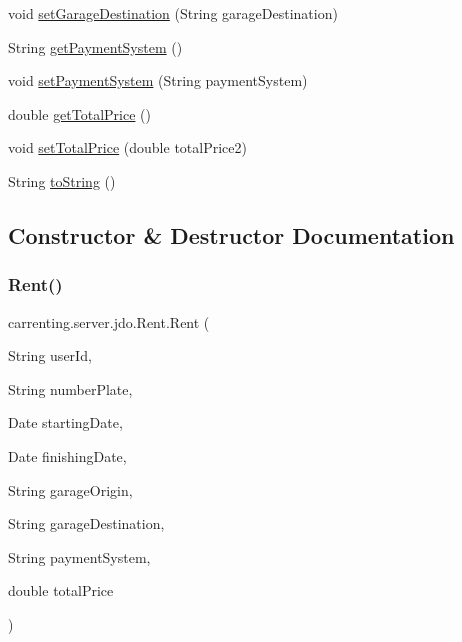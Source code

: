 \begin{DoxyCompactItemize}
\item 
void \mbox{\hyperlink{classcarrenting_1_1server_1_1jdo_1_1_rent_ac870d316225d6abab7021b785f8d8a58}{set\+Garage\+Destination}} (String garage\+Destination)
\item 
String \mbox{\hyperlink{classcarrenting_1_1server_1_1jdo_1_1_rent_a1329c3199ae2e2639285116a5cdfd54e}{get\+Payment\+System}} ()
\item 
void \mbox{\hyperlink{classcarrenting_1_1server_1_1jdo_1_1_rent_a1487539ca87230013a7249c081f0d392}{set\+Payment\+System}} (String payment\+System)
\item 
double \mbox{\hyperlink{classcarrenting_1_1server_1_1jdo_1_1_rent_a93af9f286a769e4d8e0f36ea952f3433}{get\+Total\+Price}} ()
\item 
void \mbox{\hyperlink{classcarrenting_1_1server_1_1jdo_1_1_rent_ac3fb05bd3d69ae7ab0e7f141e4865f22}{set\+Total\+Price}} (double total\+Price2)
\item 
String \mbox{\hyperlink{classcarrenting_1_1server_1_1jdo_1_1_rent_a0b24f3a2451eebba996054aaca563f36}{to\+String}} ()
\end{DoxyCompactItemize}


\subsection{Constructor \& Destructor Documentation}
\mbox{\label{classcarrenting_1_1server_1_1jdo_1_1_rent_ad9020a4971425f47e303fb3436f516fb}} 
\subsubsection{\texorpdfstring{Rent()}{Rent()}}
{\footnotesize\ttfamily carrenting.\+server.\+jdo.\+Rent.\+Rent (\begin{DoxyParamCaption}\item[{String}]{user\+Id,  }\item[{String}]{number\+Plate,  }\item[{Date}]{starting\+Date,  }\item[{Date}]{finishing\+Date,  }\item[{String}]{garage\+Origin,  }\item[{String}]{garage\+Destination,  }\item[{String}]{payment\+System,  }\item[{double}]{total\+Price }\end{DoxyParamCaption})}



